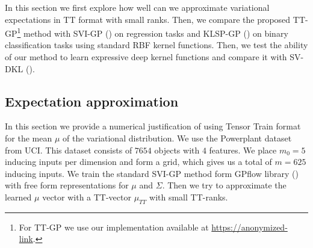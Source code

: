 In this section we first explore how well can we approximate variational
expectations in TT format with small ranks.
Then, we compare the proposed TT-GP\footnote{For TT-GP we use our implementation available at
\url{https://anonymized-link}.} method with SVI-GP (\citet{hensman2013}) on regression tasks and KLSP-GP
(\citet{hensman2015}) on binary classification tasks using standard RBF kernel
functions. Then, we test the ability of our method to learn
expressive deep kernel functions and compare it with SV-DKL
(\citet{wilson2016stochastic}).

\subsection{Expectation approximation}
\label{expect_approx}

In this section we provide a numerical justification of using Tensor Train
format for the mean $\mu$ of the variational distribution. We use the Powerplant
dataset from UCI. This dataset consists of $7654$ objects with $4$ features. We place 
$m_0 = 5$ inducing inputs per dimension and form a grid, which gives us a total of $m = 625$
inducing inputs. We train the standard SVI-GP method form GPflow library
(\citet{GPflow2016}) with free form representations for $\mu$ and $\Sigma$.
Then we try to approximate the learned $\mu$ vector with a TT-vector 
$\mu_{TT}$ with small TT-ranks. 

